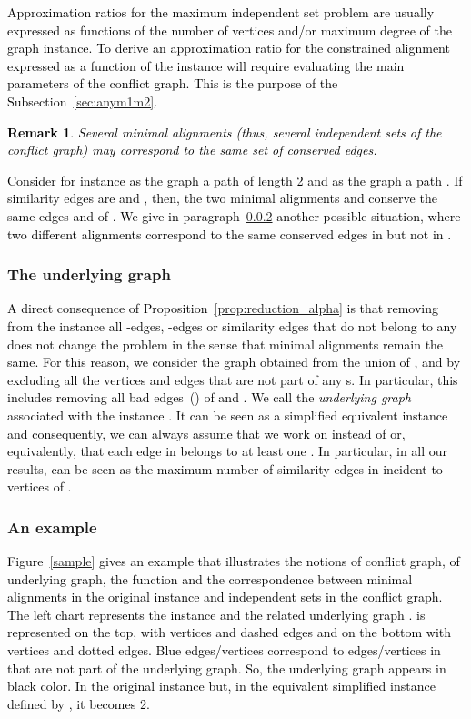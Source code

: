 \documentclass[final]{dmtcs-episciences}
\newtheorem{remark}[theorem]{Remark}
\newcommand\mar[1]{\textcolor{black}{#1}}
\begin{document}
\mar{Approximation ratios for the maximum independent set problem are usually expressed as functions of the number of vertices and/or maximum degree of the graph instance.  To derive an approximation ratio for the constrained alignment expressed as a function of the instance  will require evaluating the main parameters of the conflict graph. This is the purpose of the Subsection~\ref{sec:anym1m2}.}

\mar{\begin{remark}\label{rem:noninjective}
Several minimal alignments (thus, several independent sets of the conflict graph) may correspond to the same set of conserved edges.
\end{remark}}

 \mar{Consider for instance as the graph  a path  of length 2 and  as the graph  a path . If similarity edges are   and , then, the two minimal alignments  and  conserve the same edges  and  of . We give in paragraph~\ref{subsub:figure} another possible situation, where two different alignments correspond to the same conserved edges in  but not in .}

\subsubsection{The underlying graph}

\mar{A direct consequence of Proposition~\ref{prop:reduction_alpha} is that removing from the instance   all -edges, -edges or similarity edges that do not belong to any  does not change the problem in the sense that minimal alignments remain the same. For this reason, we  
 consider the graph  
obtained from the union of , and  by excluding all the vertices and edges that are not part of 
any s. In particular, this includes removing all bad edges~(\citet{Fertin200990}) of  and . We call  the {\em underlying graph} associated with the instance .  It can be seen  as a simplified equivalent instance and consequently, we can always assume that we work on  instead of  or, equivalently, that each edge in  belongs to at least one . In particular, in all our results,  can be seen as the maximum number of similarity edges in  incident to vertices of .}   

\subsubsection{An example}\label{subsub:figure}

\mar{Figure~\ref{sample} gives an example that illustrates the notions of conflict graph, of underlying graph, the function  and the correspondence between minimal alignments in the original instance and independent sets in the conflict graph.  The left chart represents the instance  and the related underlying graph .  is represented on the top, with vertices  and dashed edges and  on the bottom  with vertices  and dotted edges.  Blue edges/vertices correspond to edges/vertices in  that are not part of the underlying graph. So, the underlying graph  appears in black color. In the original instance  but, in the equivalent simplified instance defined by , it becomes 2.}
\end{document}
